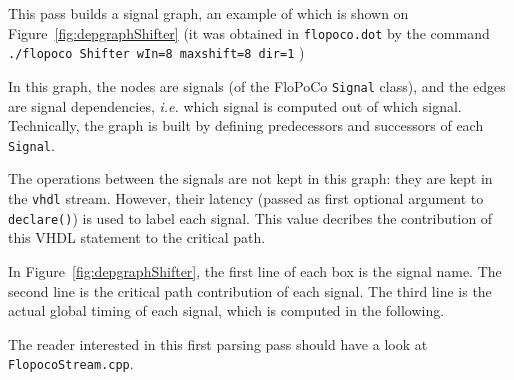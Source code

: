 \documentclass{article}
\begin{document}
This pass builds  a signal graph, an example of which is shown on Figure~\ref{fig:depgraphShifter} 
(it was obtained in \texttt{flopoco.dot} by the command
\verb!./flopoco Shifter wIn=8 maxshift=8 dir=1! )

In this graph, the nodes are signals (of the FloPoCo \texttt{Signal} class), and the edges are signal dependencies, \emph{i.e.} which signal is computed out of which signal.
Technically, the graph is built by defining predecessors and successors of each \texttt{Signal}.

The operations between the signals are not kept in this graph: they are kept in the \texttt{vhdl} stream.
  However, their latency (passed as first optional argument to  \texttt{declare()}) is used to label each signal.
  This value decribes the contribution of this VHDL statement to the critical path.

  In Figure~\ref{fig:depgraphShifter}, the first line of each box is the signal name.
The second line is the critical path contribution of each signal.
  The third line is the actual global timing of each signal, which is computed in the following. 
  
The reader interested in this first parsing pass should have a look at \texttt{FlopocoStream.cpp}.
\end{document}
